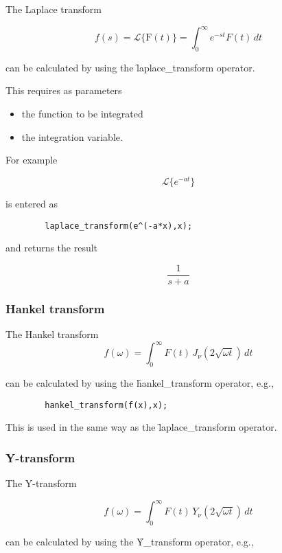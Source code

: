 The Laplace transform

\[
f(s) = \mathcal{L}\{\mathrm{F}(t)\} = \int_{0}^{\infty} e^{-st}F(t)\,dt
\]

can be calculated by using the \f{laplace\_transform} operator.

This requires as parameters
\begin{itemize}
\item the function to be integrated
\item the integration variable.
\end{itemize}

For example

\[
\mathcal{L}\{e^{-at}\}
\]

is entered as

\begin{verbatim}
        laplace_transform(e^(-a*x),x);
\end{verbatim}

and returns the result

\[
\frac{1}{s+a}
\]

\subsubsection{Hankel transform}
\hypertarget{operator:HANKEL_TRANSFORM}{}

The Hankel transform
\[
f(\omega) = \int_{0}^{\infty} F(t) \,J_{\nu}(2\sqrt{\omega t}) \,dt
\]

can be calculated by using the \f{hankel\_transform} operator, e.g.,

\begin{verbatim}
        hankel_transform(f(x),x);
\end{verbatim}

This is used in the same way as the \f{laplace\_transform} operator.

\subsubsection{Y-transform}
\hypertarget{operator:Y_TRANSFORM}{}

The Y-transform

\[
f(\omega) = \int_{0}^{\infty} F(t) \,Y_{\nu}(2\sqrt{\omega t}) \,dt
\]

can be calculated by using the \f{Y\_transform} operator, e.g.,

